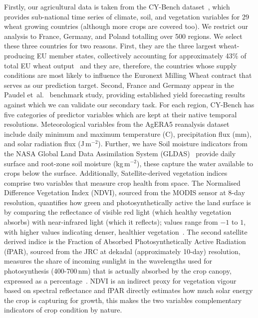 \documentclass[pdflatex,sn-mathphys-num, oneside, 11pt]{sn-jnl}%
\theoremstyle{thmstyleone}%
\theoremstyle{thmstyletwo}%
\theoremstyle{thmstylethree}%
\begin{document}
Firstly, our agricultural data is taken from the CY-Bench dataset~\cite{bib17}, which provides sub-national time series of climate, soil, and vegetation variables for 29 wheat growing countries (although more crops are covered too). We restrict our analysis to France, Germany, and Poland totalling over 500 regions. We select these three countries for two reasons. First, they are the three largest wheat-producing EU member states, collectively accounting for approximately 43\% of total EU wheat output~\cite{bib28} and they are, therefore, the countries whose supply conditions are most likely to influence the Euronext Milling Wheat contract that serves as our prediction target. Second, France and Germany appear in the Paudel et~al.~\cite{bib16} benchmark study, providing established yield forecasting results against which we can validate our secondary task. For each region, CY-Bench has five categories of predictor variables which are kept at their native temporal resolutions. Meteorological variables from the AgERA5 reanalysis dataset~\cite{bib_boogaard2022} include daily minimum and maximum temperature (\textdegree C), precipitation flux (mm), and solar radiation flux (J\,m$^{-2}$). Further, we have Soil moisture indicators from the NASA Global Land Data Assimilation System (GLDAS)~\cite{bib_rodell2004} provide daily surface and root-zone soil moisture (kg\,m$^{-2}$), these capture the water available to crops below the surface. Additionally, Satellite-derived vegetation indices comprise two variables that measure crop health from space. The Normalised Difference Vegetation Index (NDVI), sourced from the MODIS sensor at 8-day resolution, quantifies how green and photosynthetically active the land surface is by comparing the reflectance of visible red light (which healthy vegetation absorbs) with near-infrared light (which it reflects); values range from $-1$ to $1$, with higher values indicating denser, healthier vegetation~\cite{bib_vermote2015}. The second satellite derived indice is the Fraction of Absorbed Photosynthetically Active Radiation (fPAR), sourced from the JRC at dekadal (approximately 10-day) resolution, measures the share of incoming sunlight in the wavelengths used for photosynthesis (400-700\,nm) that is actually absorbed by the crop canopy, expressed as a percentage~\cite{bib_seguini}. NDVI is an indirect proxy for vegetation vigour based on spectral reflectance and fPAR directly estimates how much solar energy the crop is capturing for growth, this makes the two variables complementary indicators of crop condition by nature.\\
\end{document}
